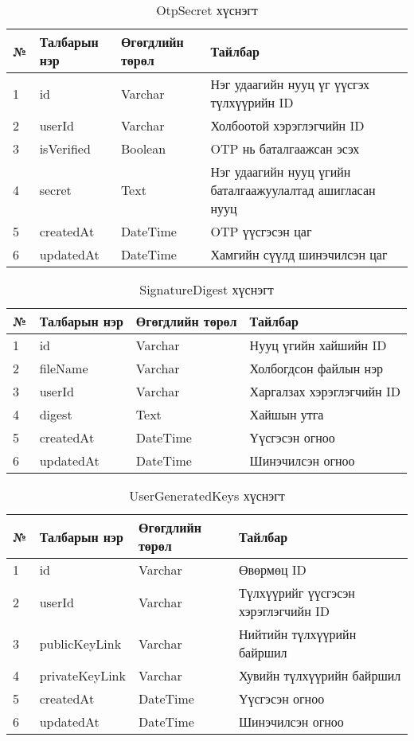 \begin{table}[h]
	\caption{OtpSecret хүснэгт}
	\begin{tabular}{|l|l|l|p{8cm}|}
	\hline
	№ &  Талбарын нэр & Өгөгдлийн төрөл & Тайлбар \\ \hline
	1 &  id & Varchar & Нэг удаагийн нууц үг үүсгэх түлхүүрийн ID\\ \hline
	2 &  userId & Varchar & Холбоотой хэрэглэгчийн ID \\ \hline
	3 &  isVerified & Boolean & OTP нь баталгаажсан эсэх \\ \hline
	4 &  secret & Text & Нэг удаагийн нууц үгийн баталгаажуулалтад ашигласан нууц \\ \hline
	5 &  createdAt & DateTime & OTP үүсгэсэн цаг\\ \hline
	6 &  updatedAt & DateTime & Хамгийн сүүлд шинэчилсэн цаг\\ \hline
\end{tabular}
\end{table}

\begin{table}[h]
	\caption{SignatureDigest хүснэгт}
	\begin{tabular}{|l|l|l|p{8cm}|}
	\hline
	№ &  Талбарын нэр & Өгөгдлийн төрөл & Тайлбар \\ \hline
	1 &  id & Varchar & Нууц үгийн хайшийн ID\\ \hline
	2 &  fileName & Varchar & Холбогдсон файлын нэр \\ \hline
	3 &  userId & Varchar & Харгалзах хэрэглэгчийн ID\\ \hline
	4 &  digest & Text & Хайшын утга \\ \hline
	5 &  createdAt & DateTime & Үүсгэсэн огноо \\ \hline
	6 &  updatedAt & DateTime & Шинэчилсэн огноо \\ \hline
\end{tabular}
\end{table}

\begin{table}[h]
	\caption{UserGeneratedKeys хүснэгт}
	\begin{tabular}{|l|l|l|p{8cm}|}
	\hline
	№ &  Талбарын нэр & Өгөгдлийн төрөл & Тайлбар \\ \hline
	1 &  id & Varchar & Өвөрмөц ID\\ \hline
	2 &  userId & Varchar & Түлхүүрийг үүсгэсэн хэрэглэгчийн ID \\ \hline
	3 &  publicKeyLink & Varchar & Нийтийн түлхүүрийн байршил \\ \hline
	4 &  privateKeyLink & Varchar & Хувийн түлхүүрийн байршил \\ \hline
	5 &  createdAt & DateTime & Үүсгэсэн огноо \\ \hline
	6 &  updatedAt & DateTime & Шинэчилсэн огноо \\ \hline
\end{tabular}
\end{table}